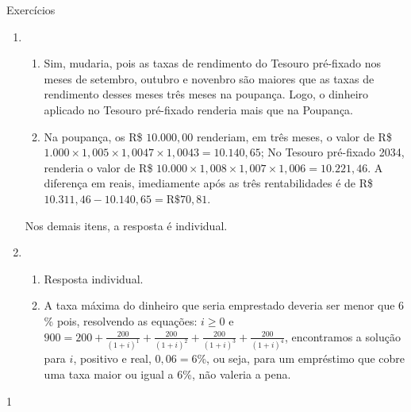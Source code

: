 \begin{answer}{Exercícios}
{\exerciselist
  \begin{enumerate}
    \item 
    \begin{enumerate}
      \item Sim, mudaria, pois as taxas de rendimento do Tesouro pré-fixado nos meses de setembro, outubro e novenbro são maiores que as taxas de rendimento desses meses três meses na poupança. Logo, o dinheiro aplicado no Tesouro pré-fixado renderia mais que na Poupança.
      \item Na poupança, os R\$ $10.000,00$ renderiam, em três meses, o valor de R\$ $1.000\times1{,}005\times1{,}0047\times1{,}0043=10.140{,}65$; No Tesouro pré-fixado 2034, renderia o valor de R\$ $10.000\times 1{,}008\times 1{,}007\times 1{,}006=10.221{,}46$. A diferença em reais, imediamente após as três rentabilidades é de R\$ $10.311{,}46-10.140{,}65=\text{R\$ }70{,}81$.

    \end{enumerate}
    Nos demais itens, a resposta é individual.
    \item
    \begin{enumerate}
      \item Resposta individual.
      \item A taxa máxima do dinheiro que seria emprestado deveria ser menor que $6$\% pois, resolvendo as equações: $i\geq0$ e $900=\displaystyle200+\frac{200}{(1+i)^1}+\frac{200}{(1+i)^2}+\frac{200}{(1+i)^3}+\frac{200}{(1+i)^4}$, encontramos a solução para $i$,  positivo e real, $0{,}06=6$\%, ou seja, para um empréstimo que cobre uma taxa maior ou igual a $6$\%, não valeria a pena.
    \end{enumerate}
  \end{enumerate}
}{1}
\end{answer}
\clearmargin

